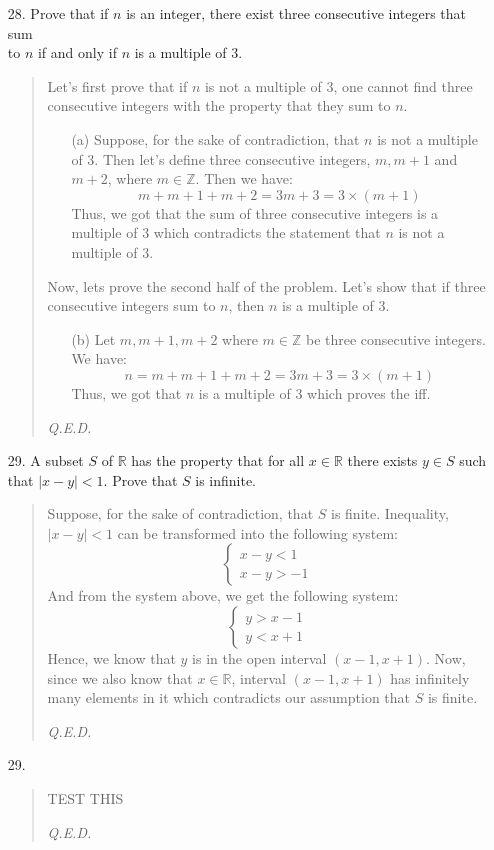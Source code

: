 \documentclass[12pt, a4paper]{article}                      %
\begin{document}
\begin{enumerate}
\item[28.]
Prove that if $n$ is an integer, there exist three consecutive integers that sum\\
to $n$ if and only if $n$ is a multiple of 3.
\begin{quote}
Let's first prove that if $n$ is not a multiple of 3, one cannot find
three consecutive integers with the property that they sum to $n$.
\begin{itemize}
\item[(a)]
Suppose, for the sake of contradiction, that $n$ is not a multiple of 3.
Then let's define three consecutive integers, $m, m + 1$ and $m + 2$, where $m \in \mathbb{Z}$.
Then we have:
$$
m + m + 1 + m + 2 = 3m + 3 = 3 \times (m + 1)
$$
Thus, we got that the sum of three consecutive integers is a multiple of 3
which contradicts the statement that $n$ is not a multiple of 3.
\end{itemize}
Now, lets prove the second half of the problem. Let's show that
if three consecutive integers sum to $n$, then $n$ is a multiple
of 3.
\begin{itemize}
\item[(b)]
Let $m, m+1, m+2$ where $m \in \mathbb{Z}$ be three consecutive integers.
We have:
$$
n = m + m + 1 + m + 2 = 3m + 3 = 3\times(m+1)
$$
Thus, we got that $n$ is a multiple of 3 which proves the iff.
\end{itemize}
\begin{flushright}
\textit{Q.E.D.}
\end{flushright}
\end{quote}


\item[29.]
A subset $S$ of $\mathbb{R}$ has the property that for all $x \in \mathbb{R}$
there exists $y \in S$ such that $|x - y| < 1$. Prove that $S$ is infinite.

\begin{quote}
Suppose, for the sake of contradiction, that $S$ is finite.
Inequality, $|x - y| < 1$ can be transformed into the following system:
$$
\begin{cases}
x - y < 1\\
x - y > -1
\end{cases}
$$
And from the system above, we get the following system:
$$
\begin{cases}
y > x - 1\\
y < x + 1
\end{cases}
$$
Hence, we know that $y$ is in the open interval $(x-1, x+1)$.
Now, since we also know that $x \in \mathbb{R}$, interval $(x-1, x+1)$
has infinitely many elements in it which contradicts our assumption
that $S$ is finite.
\begin{flushright}
\textit{Q.E.D.}
\end{flushright}
\end{quote}

\item[29.]
\begin{quote}
TEST THIS
\begin{flushright}
\textit{Q.E.D.}
\end{flushright}
\end{quote}


\end{enumerate}
\end{document}
